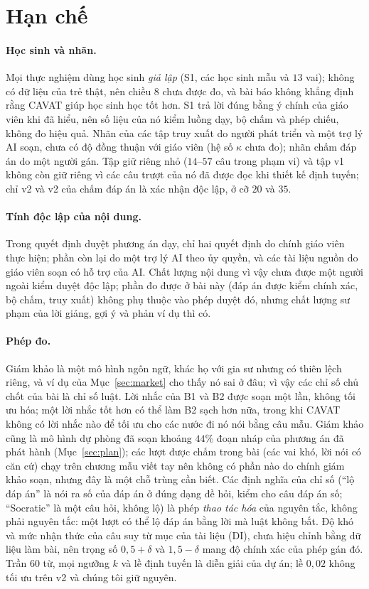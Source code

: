 \section{Hạn chế}\label{sec:limits}

\paragraph{Học sinh và nhãn.}
Mọi thực nghiệm dùng học sinh \emph{giả lập} (S1, các học sinh mẫu và $13$ vai); không có dữ liệu của trẻ thật, nên chiều 8 chưa được đo, và bài báo không khẳng định rằng CAVAT giúp học sinh học tốt hơn. S1 trả lời đúng bằng ý chính của giáo viên khi đã hiểu, nên số liệu của nó kiểm luồng dạy, bộ chấm và phép chiếu, không đo hiệu quả. Nhãn của các tập truy xuất do người phát triển và một trợ lý AI soạn, chưa có độ đồng thuận với giáo viên (hệ số $\kappa$ chưa đo); nhãn chấm đáp án do một người gán. Tập giữ riêng nhỏ ($14$--$57$ câu trong phạm vi) và tập v1 không còn giữ riêng vì các câu trượt của nó đã được đọc khi thiết kế định tuyến; chỉ v2 và v2 của chấm đáp án là xác nhận độc lập, ở cỡ $20$ và $35$.

\paragraph{Tính độc lập của nội dung.}
Trong \NDecisions{} quyết định duyệt phương án dạy, chỉ hai quyết định do chính giáo viên thực hiện; phần còn lại do một trợ lý AI theo ủy quyền, và các tài liệu nguồn do giáo viên soạn có hỗ trợ của AI. Chất lượng nội dung vì vậy chưa được một người ngoài kiểm duyệt độc lập; phần đo được ở bài này (đáp án được kiểm chính xác, bộ chấm, truy xuất) không phụ thuộc vào phép duyệt đó, nhưng chất lượng sư phạm của lời giảng, gợi ý và phản ví dụ thì có.

\paragraph{Phép đo.}
Giám khảo là một mô hình ngôn ngữ, khác họ với gia sư nhưng có thiên lệch riêng, và ví dụ của Mục~\ref{sec:market} cho thấy nó sai ở đâu; vì vậy các chỉ số chủ chốt của bài là chỉ số luật. Lời nhắc của B1 và B2 được soạn một lần, không tối ưu hóa; một lời nhắc tốt hơn có thể làm B2 sạch hơn nữa, trong khi CAVAT không có lời nhắc nào để tối ưu cho các nước đi nó nói bằng câu mẫu. Giám khảo  cũng là mô hình dự phòng đã soạn khoảng $44\%$ đoạn nháp của phương án đã phát hành (Mục~\ref{sec:plan}); các lượt được chấm trong bài (các vai khó, lời nói có căn cứ) chạy trên chương mẫu viết tay nên không có phần nào do chính giám khảo soạn, nhưng đây là một chỗ trùng cần biết. Các định nghĩa của chỉ số (``lộ đáp án'' là nói ra số của đáp án ở đúng dạng đề hỏi, kiểm cho câu đáp án số; ``Socratic'' là một câu hỏi, không lộ) là phép \emph{thao tác hóa} của nguyên tắc, không phải nguyên tắc: một lượt có thể lộ đáp án bằng lời mà luật không bắt. Độ khó và mức nhận thức của câu suy từ mục của tài liệu (DI), chưa hiệu chỉnh bằng dữ liệu làm bài, nên trọng số $0{,}5+\delta$ và $1{,}5-\delta$ mang độ chính xác của phép gán đó. Trần $60$ từ, mọi ngưỡng $k$ và lề định tuyến là diễn giải của dự án; lề $0{,}02$ không tối ưu trên v2 và chúng tôi giữ nguyên.


